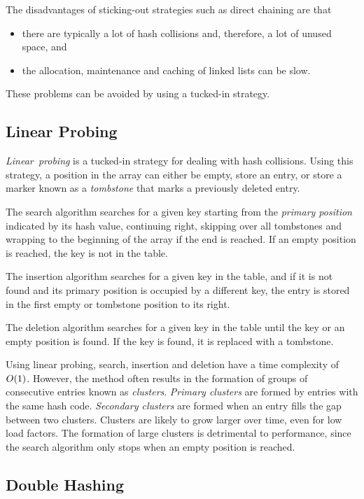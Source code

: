 The disadvantages of sticking-out strategies such as direct chaining are that
\begin{itemize}
  \item there are typically a lot of hash collisions and, therefore, a lot of unused space, and
  \item the allocation, maintenance and caching of linked lists can be slow.
\end{itemize}
These problems can be avoided by using a tucked-in strategy.

\subsection{Linear Probing}

\emph{Linear~probing} is a tucked-in strategy for dealing with hash collisions.
Using this strategy, a position in the array can either be empty, store an entry, or store a marker known as a \emph{tombstone} that marks a previously deleted entry.

The search algorithm searches for a given key starting from the \emph{primary position} indicated by its hash value, continuing right, skipping over all tombstones and wrapping to the beginning of the array if the end is reached.
If an empty position is reached, the key is not in the table.

The insertion algorithm searches for a given key in the table, and if it is not found and its primary position is occupied by a different key, the entry is stored in the first empty or tombstone position to its right.

The deletion algorithm searches for a given key in the table until the key or an empty position is found.
If the key is found, it is replaced with a tombstone.

Using linear probing, search, insertion and deletion have a time complexity of \( O\!\left(1\right) \).
However, the method often results in the formation of groups of consecutive entries known as \emph{clusters}.
\emph{Primary clusters} are formed by entries with the same hash code.
\emph{Secondary clusters} are formed when an entry fills the gap between two clusters.
Clusters are likely to grow larger over time, even for low load factors.
The formation of large clusters is detrimental to performance, since the search algorithm only stops when an empty position is reached.

\subsection{Double Hashing}

